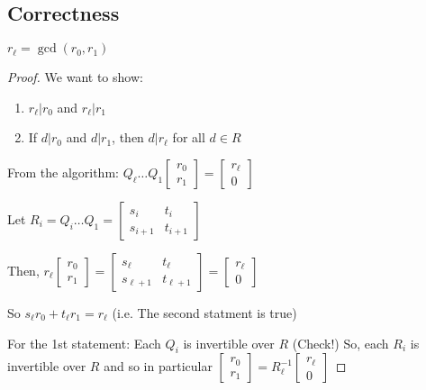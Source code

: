 \subsection{Correctness}
\begin{proposition}{}{}
    $r_{\ell} = \gcd(r_0, r_1)$
\end{proposition}
\begin{proof}
    We want to show:
    \begin{enumerate}
        \item $r_\ell | r_0$ and $r_\ell | r_1$
        \item If $d | r_0$ and $d | r_1$, then $d | r_\ell$ for all $d \in R$
    \end{enumerate}
    From the algorithm: $Q_\ell \ldots Q_1 \begin{bmatrix}r_0 \\ r_1 \end{bmatrix} = \begin{bmatrix}
        r_\ell \\ 0
    \end{bmatrix}$

    Let $R_i = Q_i\ldots Q_1 = \begin{bmatrix}
        s_i & t_i \\
        s_{i+1} & t_{i+1}
    \end{bmatrix}$

    Then, $r_\ell \begin{bmatrix}
        r_0 \\ r_1
    \end{bmatrix} = 
    \begin{bmatrix}
        s_\ell & t_\ell \\
        s_{\ell+1} & t_{\ell+1}
    \end{bmatrix}
    = 
    \begin{bmatrix}
        r_\ell \\ 0
    \end{bmatrix}$

    So $s_\ell r_0 + t_\ell r_1 = r_\ell$ (i.e. The second statment is true)

    For the 1st statement:
    Each $Q_i$ is invertible over $R$ (Check!) So, each $R_i$ is invertible over $R$ and so in particular $\begin{bmatrix}
        r_0 \\ r_1
    \end{bmatrix} = R_\ell^{-1}\begin{bmatrix}
        r_\ell \\ 0
    \end{bmatrix}$
\end{proof}

